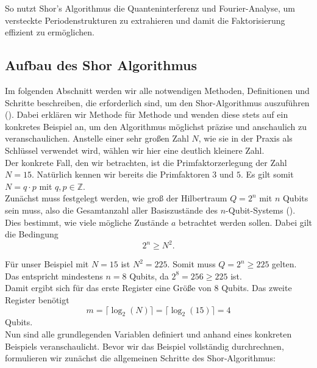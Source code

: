 So nutzt Shor's Algorithmus die Quanteninterferenz und Fourier-Analyse, um versteckte Periodenstrukturen zu extrahieren und damit die Faktorisierung effizient zu ermöglichen.

\subsection{Aufbau des Shor Algorithmus}

Im folgenden Abschnitt werden wir alle notwendigen Methoden, Definitionen und Schritte beschreiben, die erforderlich sind, um den Shor-Algorithmus auszuführen (\cite[15-17]{shor_polynomial-time_1994}). Dabei erklären wir Methode für Methode und wenden diese stets auf ein konkretes Beispiel an, um den Algorithmus möglichst präzise und anschaulich zu veranschaulichen. Anstelle einer sehr großen Zahl \( N \), wie sie in der Praxis als Schlüssel verwendet wird, wählen wir hier eine deutlich kleinere Zahl. \\

Der konkrete Fall, den wir betrachten, ist die Primfaktorzerlegung der Zahl \( N = 15 \). Natürlich kennen wir bereits die Primfaktoren \( 3 \) und \( 5 \). Es gilt somit \( N = q \cdot p \) mit \( q, p \in \mathbb{Z} \). \\

Zunächst muss festgelegt werden, wie groß der Hilbertraum \( Q = 2^n \) mit \( n \) Qubits sein muss, also die Gesamtanzahl aller Basiszustände des \( n \)-Qubit-Systems (\cite[5-6]{shor_polynomial-time_1994}). Dies bestimmt, wie viele mögliche Zustände \( a \) betrachtet werden sollen. Dabei gilt die Bedingung
\[
2^n \geq N^2.
\]

Für unser Beispiel mit \( N = 15 \) ist \( N^2 = 225 \). Somit muss \( Q = 2^n \geq 225 \) gelten. Das entspricht mindestens \( n = 8 \) Qubits, da \( 2^8 = 256 \geq 225 \) ist. \\

Damit ergibt sich für das erste Register eine Größe von \( 8 \) Qubits. Das zweite Register benötigt
\[
m = \lceil \log_2(N) \rceil = \lceil \log_2(15) \rceil = 4
\]
Qubits.\\

Nun sind alle grundlegenden Variablen definiert und anhand eines konkreten Beispiels veranschaulicht. 
Bevor wir das Beispiel vollständig durchrechnen, formulieren wir zunächst die allgemeinen Schritte des Shor‑Algorithmus:

